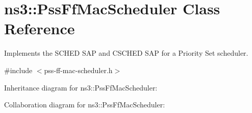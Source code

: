 \hypertarget{classns3_1_1PssFfMacScheduler}{}\section{ns3\+:\+:Pss\+Ff\+Mac\+Scheduler Class Reference}
\label{classns3_1_1PssFfMacScheduler}


Implements the S\+C\+H\+ED S\+AP and C\+S\+C\+H\+ED S\+AP for a Priority Set scheduler.  




{\ttfamily \#include $<$pss-\/ff-\/mac-\/scheduler.\+h$>$}



Inheritance diagram for ns3\+:\+:Pss\+Ff\+Mac\+Scheduler\+:


Collaboration diagram for ns3\+:\+:Pss\+Ff\+Mac\+Scheduler\+:
